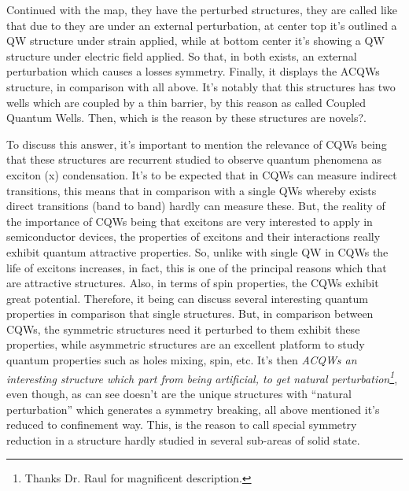 Continued with the map, they have the perturbed structures, they are called like that due to they are under an external perturbation, at center top  it's outlined a QW structure under strain applied, while at bottom center  it's showing a QW structure under electric field applied. So that, in both exists, an external perturbation which causes a losses symmetry. Finally, it displays the ACQWs structure, in comparison with all above. It's notably that this structures  has two wells which are coupled by a thin barrier, by this reason as called Coupled Quantum Wells. Then, which is the reason by these structures are novels?.   

To discuss this answer, it's important to mention the relevance of CQWs being that  these structures are recurrent studied to observe quantum phenomena as exciton  (\gls{x}) condensation\cite{butov1994condensation,butov2002towards,grosso2009excitonic}. It's to be expected that in CQWs can measure indirect transitions, this means that in comparison with a single QWs whereby exists direct transitions  (band to band) hardly can measure these. But, the reality of the importance of CQWs being that excitons are very interested to apply in semiconductor devices, the properties of excitons and their interactions really exhibit quantum attractive properties. So,  unlike with single QW in CQWs the life of excitons increases\cite{hammack2009kinetics,golub1990longlived}, in fact, this is one of the principal reasons which that are attractive structures\cite{butov1994condensation,sivalertporn2012direct,winbow2011electrostatic}. Also, in terms of spin properties, the CQWs exhibit great potential\cite{bravo2022photoluminiscence}. Therefore, it being can discuss several interesting quantum properties in comparison that single structures. But, in comparison between CQWs, the symmetric structures need it perturbed to them exhibit these properties, while asymmetric structures are an excellent platform to study quantum properties such as holes mixing, spin, etc.  
It's then \emph{ACQWs an interesting structure which part from being artificial, to get natural perturbation\footnote{Thanks Dr. Raul for magnificent description.}}, even though, as can see doesn't are the unique structures with ``natural perturbation'' which generates a symmetry breaking, all above mentioned it's reduced to confinement way. This, is the reason to call special symmetry reduction in a structure hardly studied in several sub-areas of solid state. 


